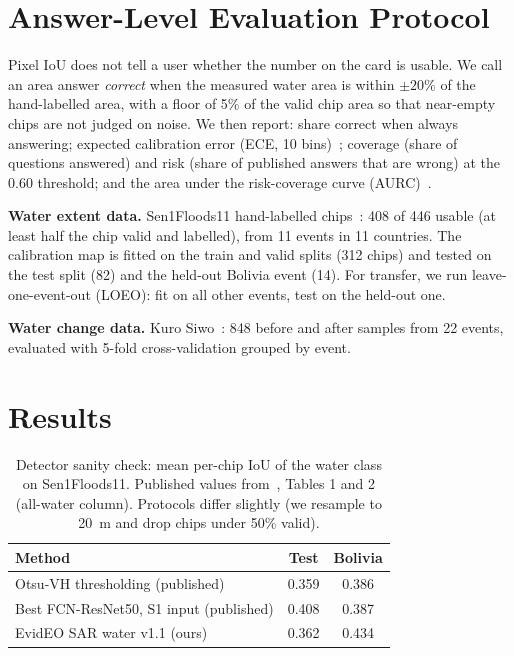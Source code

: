 \documentclass[conference]{IEEEtran}
\begin{document}
\section{Answer-Level Evaluation Protocol}
\label{sec:protocol}

Pixel IoU does not tell a user whether the number on the card is usable. We call an area answer \emph{correct} when the measured water area is within $\pm 20\%$ of the hand-labelled area, with a floor of 5\% of the valid chip area so that near-empty chips are not judged on noise. We then report: share correct when always answering; expected calibration error (ECE, 10 bins)~\cite{guo2017calibration}; coverage (share of questions answered) and risk (share of published answers that are wrong) at the 0.60 threshold; and the area under the risk-coverage curve (AURC)~\cite{geifman2017selective,geifman2019bias}.

\textbf{Water extent data.} Sen1Floods11 hand-labelled chips~\cite{bonafilia2020sen1floods11}: 408 of 446 usable (at least half the chip valid and labelled), from 11 events in 11 countries. The calibration map is fitted on the train and valid splits (312 chips) and tested on the test split (82) and the held-out Bolivia event (14). For transfer, we run leave-one-event-out (LOEO): fit on all other events, test on the held-out one.

\textbf{Water change data.} Kuro Siwo~\cite{bountos2024kurosiwo}: 848 before and after samples from 22 events, evaluated with 5-fold cross-validation grouped by event.

\section{Results}
\label{sec:results}

\begin{table}[t]
\centering
\caption{Detector sanity check: mean per-chip IoU of the water class on Sen1Floods11. Published values from~\cite{bonafilia2020sen1floods11}, Tables 1 and 2 (all-water column). Protocols differ slightly (we resample to 20~m and drop chips under 50\% valid).}
\label{tab:iou}
\begin{tabular}{lcc}
\toprule
Method & Test & Bolivia \\
\midrule
Otsu-VH thresholding (published) & 0.359 & 0.386 \\
Best FCN-ResNet50, S1 input (published) & 0.408 & 0.387 \\
EvidEO SAR water v1.1 (ours) & 0.362 & 0.434 \\
\bottomrule
\end{tabular}
\end{table}
\end{document}
